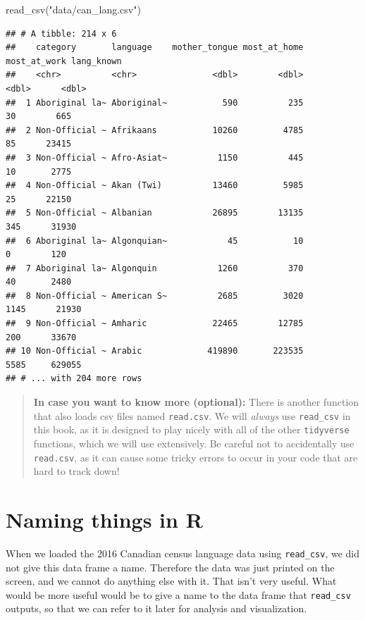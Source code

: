 \documentclass[
]{book}
\newenvironment{Shaded}{\begin{snugshade}}{\end{snugshade}}
\newcommand{\FunctionTok}[1]{\textcolor[rgb]{0,0,0}{#1}}
\newcommand{\NormalTok}[1]{#1}
\newcommand{\StringTok}[1]{\textcolor[rgb]{0.5,0.5,0.5}{#1}}
\begin{document}
\begin{Shaded}
\begin{Highlighting}[]
\FunctionTok{read\_csv}\NormalTok{(}\StringTok{"data/can\_lang.csv"}\NormalTok{)}
\end{Highlighting}
\end{Shaded}

\begin{verbatim}
## # A tibble: 214 x 6
##    category       language    mother_tongue most_at_home most_at_work lang_known
##    <chr>          <chr>               <dbl>        <dbl>        <dbl>      <dbl>
##  1 Aboriginal la~ Aboriginal~           590          235           30        665
##  2 Non-Official ~ Afrikaans           10260         4785           85      23415
##  3 Non-Official ~ Afro-Asiat~          1150          445           10       2775
##  4 Non-Official ~ Akan (Twi)          13460         5985           25      22150
##  5 Non-Official ~ Albanian            26895        13135          345      31930
##  6 Aboriginal la~ Algonquian~            45           10            0        120
##  7 Aboriginal la~ Algonquin            1260          370           40       2480
##  8 Non-Official ~ American S~          2685         3020         1145      21930
##  9 Non-Official ~ Amharic             22465        12785          200      33670
## 10 Non-Official ~ Arabic             419890       223535         5585     629055
## # ... with 204 more rows
\end{verbatim}

\begin{quote}
\textbf{In case you want to know more (optional):} There is another function
that also loads csv files named \texttt{read.csv}. We will \emph{always} use
\texttt{read\_csv} in this book, as it is designed to play nicely with all of the
other \texttt{tidyverse} functions, which we will use extensively. Be
careful not to accidentally use \texttt{read.csv}, as it can cause some tricky
errors to occur in your code that are hard to track down!
\end{quote}

\hypertarget{naming-things-in-r}{%
\section{Naming things in R}\label{naming-things-in-r}}

When we loaded the 2016 Canadian census language data
using \texttt{read\_csv}, we did not give this data frame a name.
Therefore the data was just printed on the screen,
and we cannot do anything else with it. That isn't very useful.
What would be more useful would be to give a name
to the data frame that \texttt{read\_csv} outputs,
so that we can refer to it later for analysis and visualization.
\end{document}
